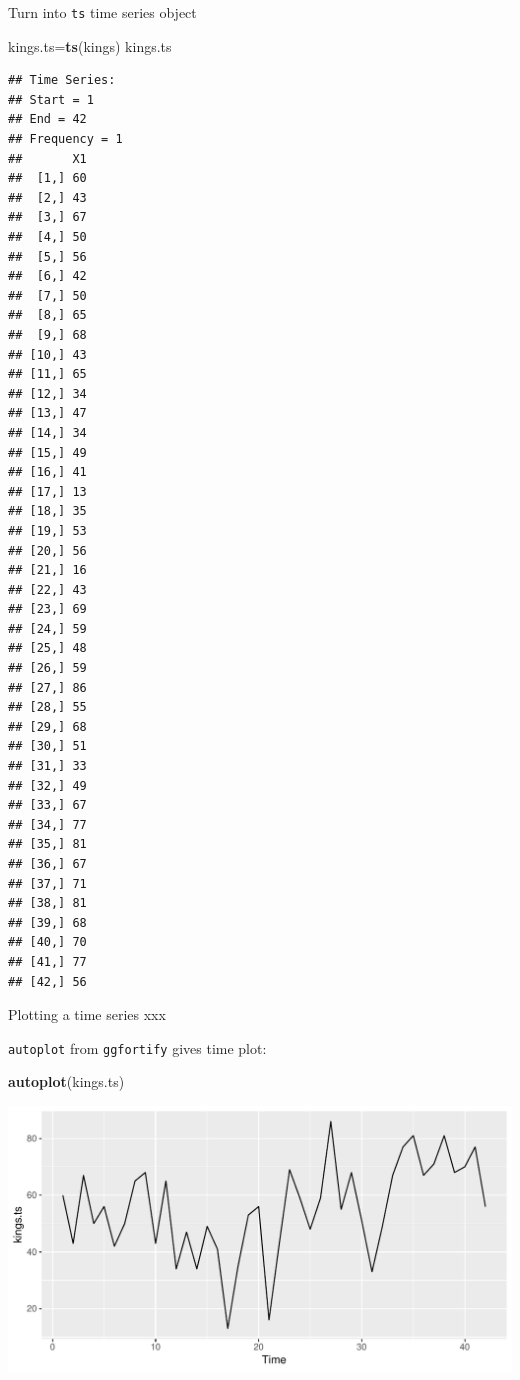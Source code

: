 \documentclass[ignorenonframetext,]{beamer}
\newenvironment{Shaded}{\begin{snugshade}}{\end{snugshade}}
\newcommand{\KeywordTok}[1]{\textcolor[rgb]{0.13,0.29,0.53}{\textbf{#1}}}
\newcommand{\NormalTok}[1]{#1}
\begin{document}
\begin{frame}[fragile]{Turn into \texttt{ts} time series object}
\protect\hypertarget{turn-into-ts-time-series-object}{}

\begin{Shaded}
\begin{Highlighting}[]
\NormalTok{kings.ts=}\KeywordTok{ts}\NormalTok{(kings)}
\NormalTok{kings.ts}
\end{Highlighting}
\end{Shaded}

\begin{verbatim}
## Time Series:
## Start = 1 
## End = 42 
## Frequency = 1 
##       X1
##  [1,] 60
##  [2,] 43
##  [3,] 67
##  [4,] 50
##  [5,] 56
##  [6,] 42
##  [7,] 50
##  [8,] 65
##  [9,] 68
## [10,] 43
## [11,] 65
## [12,] 34
## [13,] 47
## [14,] 34
## [15,] 49
## [16,] 41
## [17,] 13
## [18,] 35
## [19,] 53
## [20,] 56
## [21,] 16
## [22,] 43
## [23,] 69
## [24,] 59
## [25,] 48
## [26,] 59
## [27,] 86
## [28,] 55
## [29,] 68
## [30,] 51
## [31,] 33
## [32,] 49
## [33,] 67
## [34,] 77
## [35,] 81
## [36,] 67
## [37,] 71
## [38,] 81
## [39,] 68
## [40,] 70
## [41,] 77
## [42,] 56
\end{verbatim}

\end{frame}

\begin{frame}[fragile]{Plotting a time series xxx}
\protect\hypertarget{plotting-a-time-series-xxx}{}

\texttt{autoplot} from \texttt{ggfortify} gives time plot:

\begin{Shaded}
\begin{Highlighting}[]
\KeywordTok{autoplot}\NormalTok{(kings.ts)}
\end{Highlighting}
\end{Shaded}

\includegraphics{figure/Kings-Time-Series-1.pdf}

\end{frame}
\end{document}
